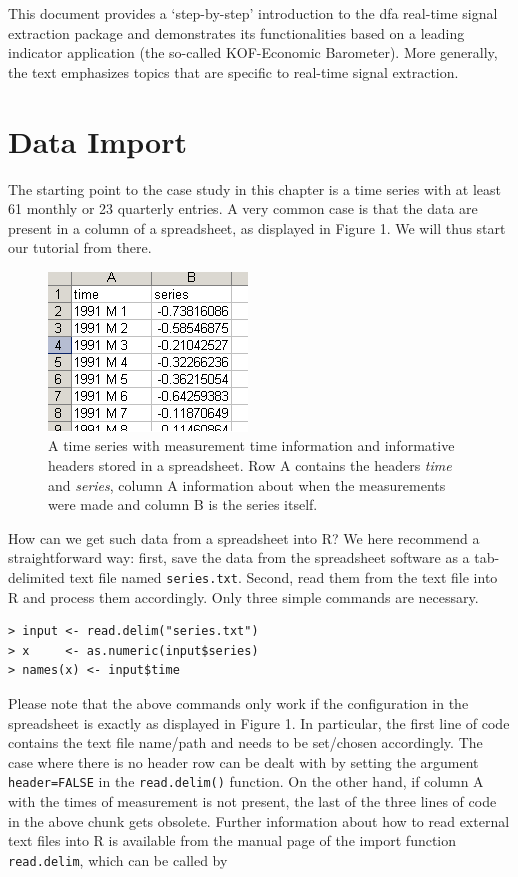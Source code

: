\documentclass[a4paper]{article}
\begin{document}
This document provides a `step-by-step' introduction to the dfa
real-time signal extraction package and demonstrates its
functionalities based on a leading indicator application (the
so-called KOF-Economic Barometer). More generally, the text emphasizes
topics that are specific to real-time signal extraction. 

\section{Data Import}

The starting point to the case study in this chapter is a time series
with at least 61 monthly or 23 quarterly entries. A very common case
is that the data are present in a column of a spreadsheet, as
displayed in Figure 1. We will thus start our tutorial from there. 

\begin{figure}[h!] 
\begin{center}
\includegraphics{excelneu}
\caption{A time series with measurement time information and
  informative headers stored in a spreadsheet. Row A contains
  the headers \emph{time} and \emph{series}, column A information
  about when the measurements were made and column B is the series
  itself.} 
\end{center}
\end{figure}

How can we get such data from a spreadsheet into R? We here recommend
a straightforward way: first, save the data from the spreadsheet
software as a tab-delimited text file named \texttt{series.txt}. 
Second, read them from the text file into R and process them
accordingly. Only three simple commands are necessary. 

\begin{verbatim}
> input <- read.delim("series.txt")
> x     <- as.numeric(input$series)
> names(x) <- input$time
\end{verbatim}

Please note that the above commands only work if the configuration in
the spreadsheet is exactly as displayed in Figure 1. In particular,
the first line of code contains the text file name/path and needs to
be set/chosen accordingly. The case where there is no header row can
be dealt with by setting the argument \texttt{header=FALSE} in the
\texttt{read.delim()} function. On the other hand, if column A with
the times of measurement is not present, the last of the three lines
of code in the above chunk gets obsolete. Further information about
how to read external text files into R is available from the manual
page of the import function \texttt{read.delim}, which can be called
by
\end{document}
